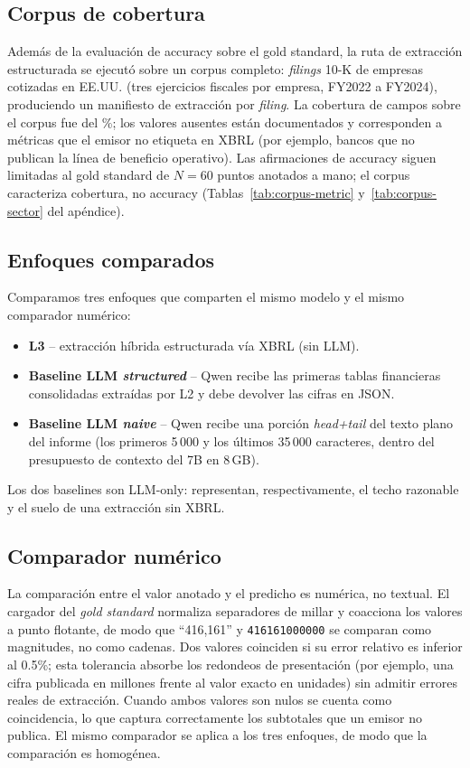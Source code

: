 \documentclass[conference]{IEEEtran}
\begin{document}
\subsection{Corpus de cobertura}
Además de la evaluación de accuracy sobre el gold standard, la ruta de
extracción estructurada se ejecutó sobre un corpus completo:
\corpusFilings{} \textit{filings} 10-K de \corpusCompanies{} empresas
cotizadas en EE.UU. (tres ejercicios fiscales por empresa, FY2022 a
FY2024), produciendo un manifiesto de extracción por \textit{filing}. La
cobertura de campos sobre el corpus fue del \corpusCoverage\%; los
valores ausentes están documentados y corresponden a métricas que el
emisor no etiqueta en XBRL (por ejemplo, bancos que no publican la línea
de beneficio operativo). Las afirmaciones de accuracy siguen limitadas al
gold standard de $N=60$ puntos anotados a mano; el corpus caracteriza
cobertura, no accuracy (Tablas~\ref{tab:corpus-metric}
y~\ref{tab:corpus-sector} del apéndice).

\subsection{Enfoques comparados}
Comparamos tres enfoques que comparten el mismo modelo y el mismo comparador
numérico:
\begin{itemize}
  \item \textbf{L3} -- extracción híbrida estructurada vía XBRL (sin LLM).
  \item \textbf{Baseline LLM \textit{structured}} -- Qwen recibe las primeras
  tablas financieras consolidadas extraídas por L2 y debe devolver las cifras en
  JSON.
  \item \textbf{Baseline LLM \textit{naive}} -- Qwen recibe una porción
  \textit{head+tail} del texto plano del informe (los primeros 5\,000 y los
  últimos 35\,000 caracteres, dentro del presupuesto de contexto del 7B en
  8\,GB).
\end{itemize}
Los dos baselines son LLM-only: representan, respectivamente, el techo razonable
y el suelo de una extracción sin XBRL.

\subsection{Comparador numérico}
La comparación entre el valor anotado y el predicho es numérica, no textual. El
cargador del \textit{gold standard} normaliza separadores de millar y coacciona
los valores a punto flotante, de modo que ``416,161'' y \texttt{416161000000} se
comparan como magnitudes, no como cadenas. Dos valores coinciden si su error
relativo es inferior al 0.5\%; esta tolerancia absorbe los redondeos de
presentación (por ejemplo, una cifra publicada en millones frente al valor exacto
en unidades) sin admitir errores reales de extracción. Cuando ambos valores son
nulos se cuenta como coincidencia, lo que captura correctamente los subtotales que
un emisor no publica. El mismo comparador se aplica a los tres enfoques, de modo
que la comparación es homogénea.
\end{document}
